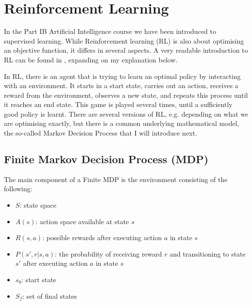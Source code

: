 
\section{Reinforcement Learning}


In the Part IB Artificial Intelligence course we have been introduced to supervised learning. While Reinforcement learning (RL) is also about optimising an objective function, it differs in several aspects. A very readable introduction to RL can be found in \cite{sutton2018RLbook}, expanding on my explanation below.


In RL, there is an agent that is trying to learn an optimal policy by interacting with an environment. It starts in a start state, carries out an action, receives a reward from the environment, observes a new state, and repeats this process until it reaches an end state. This game is played several times, until a sufficiently good policy is learnt. There are several versions of RL, e.g. depending on what we are optimising exactly, but there is a common underlying mathematical model, the so-called Markov Decision Process that I will introduce next.

\subsection{Finite Markov Decision Process (MDP)}


The main component of a Finite MDP is the environment consisting of the following:

\begin{itemize}
    \item 
    $S$: state space
    \item
    $A(s)$: action space available at state $s$
    \item
    $R(s, a)$: possible rewards after executing action $a$ in state $s$
    \item
    $P(s', r | s, a)$: the probability of receiving reward $r$ and transitioning to state $s'$ after executing action $a$ in state $s$
    \item
    $s_0$: start state
    \item
    $S_f$: set of final states
\end{itemize} 


